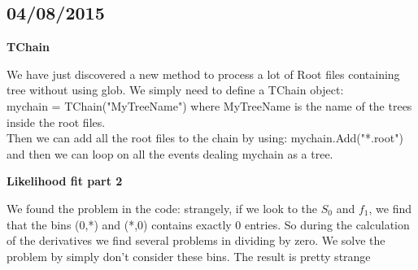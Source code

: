 \subsection{04/08/2015}

\textbf{TChain}

We have just discovered a new method to process a lot of Root files containing tree without using glob.
We simply need to define a TChain object:\\
mychain = TChain("MyTreeName")
where MyTreeName is the name of the trees inside the root files.\\
Then we can add all the root files to the chain by using:
mychain.Add("*.root")\\
and then we can loop on all the events dealing mychain as a tree.

\textbf{Likelihood fit part 2}

We found the problem in the code: strangely, if we look to the $S_0$ and $f_1$, we find that the bins (0,*) and (*,0) contains exactly 0 entries. So during the calculation of the derivatives we find several problems in dividing by zero. We solve the problem by simply don't consider these bins. The result is pretty strange 